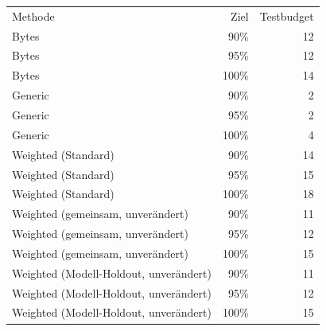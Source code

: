 \begin{tabular}{lrr}
Methode & Ziel & Testbudget \\
Bytes & 90\% & 12 \\
Bytes & 95\% & 12 \\
Bytes & 100\% & 14 \\
Generic & 90\% & 2 \\
Generic & 95\% & 2 \\
Generic & 100\% & 4 \\
Weighted (Standard) & 90\% & 14 \\
Weighted (Standard) & 95\% & 15 \\
Weighted (Standard) & 100\% & 18 \\
Weighted (gemeinsam, unverändert) & 90\% & 11 \\
Weighted (gemeinsam, unverändert) & 95\% & 12 \\
Weighted (gemeinsam, unverändert) & 100\% & 15 \\
Weighted (Modell-Holdout, unverändert) & 90\% & 11 \\
Weighted (Modell-Holdout, unverändert) & 95\% & 12 \\
Weighted (Modell-Holdout, unverändert) & 100\% & 15 \\
\end{tabular}
